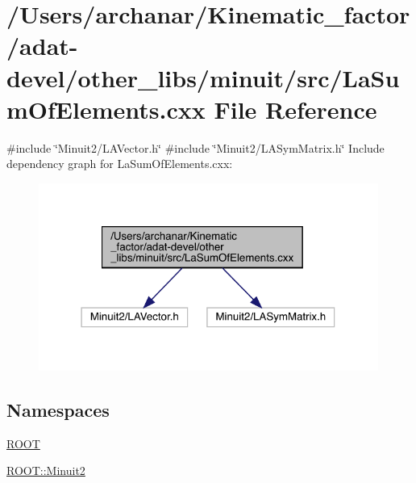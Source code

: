 \hypertarget{adat-devel_2other__libs_2minuit_2src_2LaSumOfElements_8cxx}{}\section{/\+Users/archanar/\+Kinematic\+\_\+factor/adat-\/devel/other\+\_\+libs/minuit/src/\+La\+Sum\+Of\+Elements.cxx File Reference}
\label{adat-devel_2other__libs_2minuit_2src_2LaSumOfElements_8cxx}
{\ttfamily \#include \char`\"{}Minuit2/\+L\+A\+Vector.\+h\char`\"{}}\newline
{\ttfamily \#include \char`\"{}Minuit2/\+L\+A\+Sym\+Matrix.\+h\char`\"{}}\newline
Include dependency graph for La\+Sum\+Of\+Elements.\+cxx\+:
\nopagebreak
\begin{figure}[H]
\begin{center}
\leavevmode
\includegraphics[width=316pt]{d5/d21/adat-devel_2other__libs_2minuit_2src_2LaSumOfElements_8cxx__incl}
\end{center}
\end{figure}
\subsection*{Namespaces}
\begin{DoxyCompactItemize}
\item 
 \mbox{\hyperlink{namespaceROOT}{R\+O\+OT}}
\item 
 \mbox{\hyperlink{namespaceROOT_1_1Minuit2}{R\+O\+O\+T\+::\+Minuit2}}
\end{DoxyCompactItemize}
